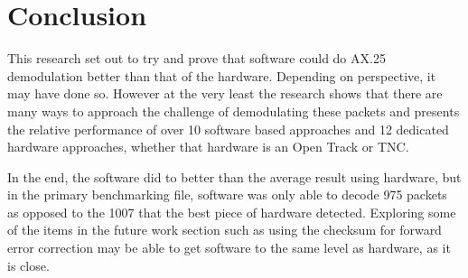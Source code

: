 \chapter{Conclusion}
This research set out to try and prove that software could do AX.25 demodulation better than that of the hardware. Depending on perspective, it may have done so. However at the very least the research shows that there are many ways to approach the challenge of demodulating these packets and presents the relative performance of over 10 software based approaches and 12 dedicated hardware approaches, whether that hardware is an Open Track or TNC.

In the end, the software did to better than the average result using hardware, but in the primary benchmarking file, software was only able to decode 975 packets as opposed to the 1007 that the best piece of hardware detected. Exploring some of the items in the future work section such as using the checksum for forward error correction may be able to get software to the same level as hardware, as it is close.